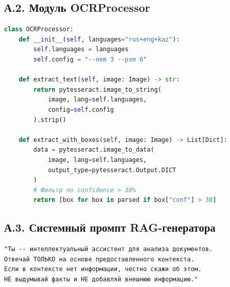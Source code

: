\documentclass[a4paper,12pt]{article}
\begin{document}
\subsection*{А.2. Модуль OCRProcessor}

\begin{lstlisting}[language=Python, caption={Фрагмент модуля OCRProcessor}]
class OCRProcessor:
    def __init__(self, languages="rus+eng+kaz"):
        self.languages = languages
        self.config = "--oem 3 --psm 6"

    def extract_text(self, image: Image) -> str:
        return pytesseract.image_to_string(
            image, lang=self.languages,
            config=self.config
        ).strip()

    def extract_with_boxes(self, image: Image) -> List[Dict]:
        data = pytesseract.image_to_data(
            image, lang=self.languages,
            output_type=pytesseract.Output.DICT
        )
        # Фильтр по confidence > 30%
        return [box for box in parsed if box["conf"] > 30]
\end{lstlisting}

\subsection*{А.3. Системный промпт RAG-генератора}

\begin{lstlisting}[caption={Системный промпт RAG-генератора}]
"Ты -- интеллектуальный ассистент для анализа документов.
Отвечай ТОЛЬКО на основе предоставленного контекста.
Если в контексте нет информации, честно скажи об этом.
НЕ выдумывай факты и НЕ добавляй внешнюю информацию."
\end{lstlisting}
\end{document}

